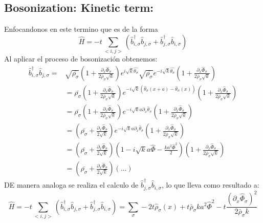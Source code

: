 \subsection{Bosonization: Kinetic term:}
Enfocandonos en este termino que es de la forma 
\begin{equation}
\hat{H} = -t \sum_{<i,j>} \left( \hat{b}_{i,\sigma}^{\dagger}\hat{b}_{j,\sigma}^{} + \hat{b}_{j,\sigma}^{\dagger} \hat{b}_{i,\sigma}^{} \right)
\end{equation}
Al aplicar el proceso de bosonización obtenemos:
\begin{align}    \hat{b}_{i,\sigma}^{\dagger}\hat{b}_{j,\sigma}^{} = &\sqrt{\bar{\rho_{\sigma}}} \left( 1+\frac{\partial_{x} \hat{\Phi}_{\sigma}} {2\bar{\rho}_{\sigma} \sqrt{k}} \right) e^{i \sqrt{k} \hat{\theta_{\sigma}}} \sqrt{\bar{\rho_{\sigma}}} e^{-i \sqrt{k} \hat{\theta_{\sigma}}} \left( 1+\frac{\partial_{x} \hat{\Phi}_{\sigma}} {2\bar{\rho}_{\sigma} \sqrt{k}} \right) \\
    &=\bar{\rho_{\sigma}} \left( 1+\frac{\partial_{x} \hat{\Phi}_{\sigma}} {2\bar{\rho}_{\sigma} \sqrt{k}} \right) e^{-i\sqrt{k} (\hat{\theta}_{\sigma}(x+a) - \hat{\theta}_{\sigma} (x))} \left( 1+\frac{\partial_{x} \hat{\Phi}_{\sigma}} {2\bar{\rho}_{\sigma} \sqrt{k}} \right)\\
    &=\bar{\rho_{\sigma}} \left( 1+\frac{\partial_{x} \hat{\Phi}_{\sigma}} {2\bar{\rho}_{\sigma} \sqrt{k}} \right) e^{-i\sqrt{k}a \partial_{x}\hat{\theta}_{\sigma}}\left( 1+\frac{\partial_{x} \hat{\Phi}_{\sigma}} {2\bar{\rho}_{\sigma} \sqrt{k}} \right)\\
    &= \left( \bar{\rho_{\sigma}}+\frac{\partial_{x} \hat{\Phi}_{\sigma}} {2 \sqrt{k}} \right) e^{-i\sqrt{k}a \partial_{x}\hat{\theta}_{\sigma}}\left( 1+\frac{\partial_{x} \hat{\Phi}_{\sigma}} {2\bar{\rho}_{\sigma} \sqrt{k}} \right) \\
    &=\left( \bar{\rho_{\sigma}}+\frac{\partial_{x} \hat{\Phi}_{\sigma}} {2 \sqrt{k}} \right) \left( 1-i\sqrt{k}a \hat{\Phi} - \frac{ka^2 \hat{\Phi}^2}{2} \right) \left( 1+\frac{\partial_{x} \hat{\Phi}_{\sigma}} {2\bar{\rho}_{\sigma} \sqrt{k}} \right) \\
    &= \left( \bar{\rho_{\sigma}}+\frac{\partial_{x} \hat{\Phi}_{\sigma}} {2 \sqrt{k}} \right) \left( ... \right)
\end{align}
DE manera analoga se realiza el calculo de $\hat{b}_{j,\sigma}^{\dagger} \hat{b}_{i,\sigma}^{} $, lo que lleva como resultado a:
\begin{equation}
    \hat{H} = -t \sum_{<i,j>} \left( \hat{b}_{i,\sigma}^{\dagger}\hat{b}_{j,\sigma}^{} + \hat{b}_{j,\sigma}^{\dagger} \hat{b}_{i,\sigma}^{} \right) =  \sum_{\sigma} -2t \hat{\rho}_{\sigma} (x) + t \bar{\rho}_{\sigma} k a^{2} \hat{\Phi}^{2} - t \frac{(\partial_{x} \hat{\Phi}_{\sigma} )^2}{2 \bar{\rho}_{\sigma} k}
\end{equation}
